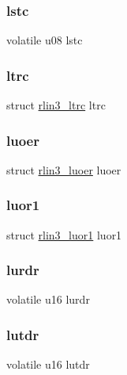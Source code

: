 \subsubsection{\texorpdfstring{lstc}{lstc}}
{\footnotesize\ttfamily volatile u08 lstc}

\mbox{\label{structrlin3_a2933d590f740253fd706cebf4b9bc9a7}} 
\subsubsection{\texorpdfstring{ltrc}{ltrc}}
{\footnotesize\ttfamily struct \mbox{\hyperlink{structrlin3__ltrc}{rlin3\+\_\+ltrc}} ltrc}

\mbox{\label{structrlin3_a931f6ea14e210e589f8711e61634a68f}} 
\subsubsection{\texorpdfstring{luoer}{luoer}}
{\footnotesize\ttfamily struct \mbox{\hyperlink{structrlin3__luoer}{rlin3\+\_\+luoer}} luoer}

\mbox{\label{structrlin3_a335f7af24e40607a142da0553fc38179}} 
\subsubsection{\texorpdfstring{luor1}{luor1}}
{\footnotesize\ttfamily struct \mbox{\hyperlink{structrlin3__luor1}{rlin3\+\_\+luor1}} luor1}

\mbox{\label{structrlin3_a4b45fc918c87227d0b4fe55d9d362642}} 
\subsubsection{\texorpdfstring{lurdr}{lurdr}}
{\footnotesize\ttfamily volatile u16 lurdr}

\mbox{\label{structrlin3_a91b49ab565401df41db4df12e386f99f}} 
\subsubsection{\texorpdfstring{lutdr}{lutdr}}
{\footnotesize\ttfamily volatile u16 lutdr}

